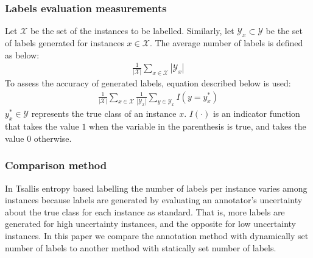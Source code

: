 \documentclass[a4paper,conference]{IEEEtran}
\begin{document}
\subsubsection{Labels evaluation measurements}\label{subsec:labels_evaluation}
Let $\mathcal{X}$ be the set of the instances to be labelled.
Similarly, let $\mathcal{Y}_{x} \subset \mathcal{Y}$ be the set of labels generated for instances $x \in \mathcal{X}$.
The average number of labels is defined as below:
\begin{align}
    \frac{1}{|\mathcal{X}|}\sum_{x \in \mathcal{X}} |\mathcal{Y}_{x}|
\end{align}
To assess the accuracy of generated labels, equation described below is used:
\begin{align}
    \frac{1}{|\mathcal{X}|}\sum_{x \in \mathcal{X}} \frac{1}{|\mathcal{Y}_{x}|} \sum_{y \in \mathcal{Y}_{x}} I(y = y^{*}_{x})
\end{align}
$y^{*}_{x} \in \mathcal{Y}$ represents the true class of an instance $x$.
$I(\cdot)$ is an indicator function that takes the value $1$ when the variable in the parenthesis is true, and takes the value $0$ otherwise.

\subsubsection{Comparison method}\label{subsec:experiment}
In Tsallis entropy based labelling the number of labels per instance varies among instances because labels are generated by evaluating an annotator's uncertainty about the true class for each instance as standard.
That is, more labels are generated for high uncertainty instances, and the opposite for low uncertainty instances.
In this paper we compare the annotation method with dynamically set number of labels to another method with statically set number of labels.
\end{document}
